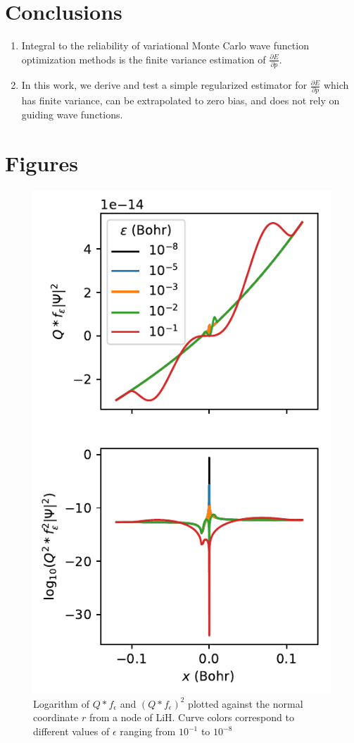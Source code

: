 \documentclass{article}
\begin{document}
\section{Conclusions}
\begin{enumerate}
\item Integral to the reliability of variational Monte Carlo wave function optimization methods is the finite variance estimation of $\frac{\partial E}{\partial p}$.

\item  In this work, we derive and test a simple regularized estimator for $\frac{\partial E}{\partial p}$ which has finite variance, can be extrapolated to zero bias, and does not rely on guiding wave functions.
\end{enumerate}

\section{Figures}
\begin{figure}
\centering
\includegraphics{../plots/viznode.pdf}
\caption{Logarithm of $Q * f_\epsilon$ and $(Q * f_\epsilon)^2$ plotted against the normal coordinate $r$ from a node of LiH. Curve colors correspond to different values of $\epsilon$ ranging from $10^{-1}$ to $10^{-8}$}
\end{figure}
\end{document}

